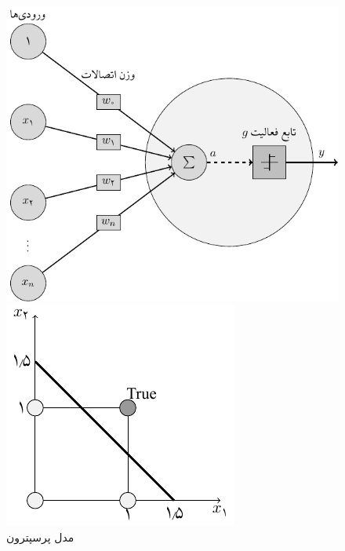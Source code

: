 \documentclass[11pt, twoside]{imsproc}
\begin{document}
\begin{figure}[t]
    \centering
    \begin{minipage}{.3\textwidth}
        \centering
			\includegraphics[width=1\linewidth]{images/perceptron_01}
			\caption{مدل پرسپترون}
			\label{fig:perceptron}
    \end{minipage}%
    \hfill
    \begin{minipage}{.28\textwidth}
        \centering
			\includegraphics[width=1\linewidth]{images/OR-plot}

\end{minipage}
\end{figure}
\end{document}
